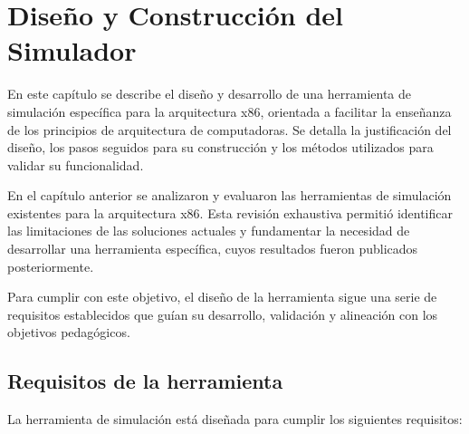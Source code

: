 \documentclass[12pt,oneside]{templates/unerthesis}
\begin{document}
\hypertarget{desarrollo}{%
\chapter{Diseño y Construcción del Simulador}\label{desarrollo}}

En este capítulo se describe el diseño y desarrollo de una herramienta de simulación específica para la arquitectura x86, orientada a facilitar la enseñanza de los principios de arquitectura de computadoras. Se detalla la justificación del diseño, los pasos seguidos para su construcción y los métodos utilizados para validar su funcionalidad.

En el capítulo anterior se analizaron y evaluaron las herramientas de simulación existentes para la arquitectura x86. Esta revisión exhaustiva permitió identificar las limitaciones de las soluciones actuales y fundamentar la necesidad de desarrollar una herramienta específica, cuyos resultados fueron publicados posteriormente.

Para cumplir con este objetivo, el diseño de la herramienta sigue una serie de requisitos establecidos que guían su desarrollo, validación y alineación con los objetivos pedagógicos.

\hypertarget{requisitos-de-la-herramienta}{%
\section{Requisitos de la herramienta}\label{requisitos-de-la-herramienta}}

La herramienta de simulación está diseñada para cumplir los siguientes requisitos:
\end{document}

